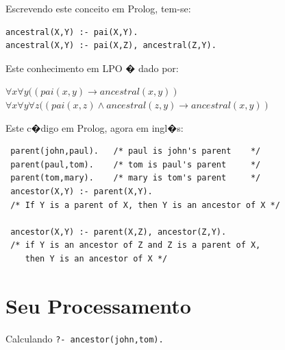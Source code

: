 \documentclass[final,a4paper]{article}
\begin{document}
Escrevendo este conceito em Prolog, tem-se:
\begin{verbatim}
ancestral(X,Y) :- pai(X,Y).
ancestral(X,Y) :- pai(X,Z), ancestral(Z,Y).
\end{verbatim}

Este  conhecimento em LPO � dado por:
\begin{flushleft}
 $\forall x \forall y ((pai(x,y) \rightarrow ancestral(x,y))$\\ 
 $\forall x \forall y \forall z((pai(x,z) \wedge  ancestral(z,y) \rightarrow ancestral(x,y))$\\ 
\end{flushleft}

\newpage
Este c�digo em Prolog, agora em ingl�s:


\begin{lstlisting}
 parent(john,paul).   /* paul is john's parent    */
 parent(paul,tom).    /* tom is paul's parent     */
 parent(tom,mary).    /* mary is tom's parent     */
 ancestor(X,Y) :- parent(X,Y).
 /* If Y is a parent of X, then Y is an ancestor of X */

 ancestor(X,Y) :- parent(X,Z), ancestor(Z,Y).
 /* if Y is an ancestor of Z and Z is a parent of X,
    then Y is an ancestor of X */ 

\end{lstlisting}


\section{Seu Processamento}

Calculando \texttt{?- ancestor(john,tom).}

\end{document}
